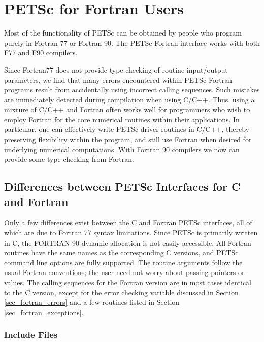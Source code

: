 \chapter{PETSc for Fortran Users}
\label{ch_fortran}

Most of the functionality of PETSc can be obtained by people who
program purely in Fortran 77 or Fortran 90.  
The PETSc Fortran interface works with both F77 and F90 compilers.

Since Fortran77 does not provide type checking of routine input/output
parameters, we find that many errors encountered within PETSc Fortran
programs result from accidentally using incorrect calling sequences.
Such mistakes are immediately detected during compilation when using
C/C++.  Thus, using a mixture of C/C++ and Fortran often works well
for programmers who wish to employ Fortran for the core numerical
routines within their applications.  In particular, one can
effectively write PETSc driver routines in C/C++, thereby preserving
flexibility within the program, and still use Fortran when desired for
underlying numerical computations. With Fortran 90 compilers we now
can provide some type checking from Fortran.

\section{Differences between PETSc Interfaces for C and Fortran}

Only a few differences exist between the C and Fortran PETSc
interfaces, all of which are due to Fortran 77 syntax limitations.
Since PETSc is primarily written in C, the FORTRAN 90 
dynamic allocation is not easily accessible.
All Fortran routines have the same names as the corresponding C
versions, and PETSc command line options are fully supported. The
routine arguments follow the usual Fortran conventions; the user need
not worry about passing pointers or values.  The calling sequences
for the Fortran version are in most cases identical to the C version,
except for the error checking variable discussed in 
Section \ref{sec_fortran_errors} and a few routines listed in 
Section \ref{sec_fortran_exceptions}.

\subsection{Include Files}
\label{sec_fortran_includes}

